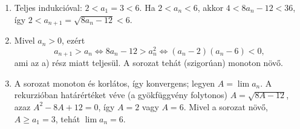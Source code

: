 \documentclass[11pt]{scrartcl}
\begin{document}
\begin{enumerate}
	\item Teljes indukcióval: $2 < a_1 = 3 < 6$. Ha $2 < a_n < 6$, akkor
	      $4 < 8a_n - 12 < 36$, így
	      $2 < a_{n + 1} = \sqrt{8a_n - 12} < 6$.

	\item Mivel $a_n > 0$, ezért
	      \[
		      a_{n + 1} > a_n
		      \iff 8a_n - 12 > a_n^2
		      \iff (a_n - 2)(a_n - 6) < 0,
	      \]
	      ami az a) rész miatt teljesül. A sorozat tehát (szigorúan) monoton
	      növő.

	\item A sorozat monoton és korlátos, így konvergens; legyen
	      $A = \lim a_n$. A rekurzióban határértéket véve (a gyökfüggvény
	      folytonos) $A = \sqrt{8A - 12}$, azaz $A^2 - 8A + 12 = 0$, így $A = 2$
	      vagy $A = 6$. Mivel a sorozat növő, $A \ge a_1 = 3$, tehát
	      $\lim a_n = 6$.
\end{enumerate}
\end{document}
